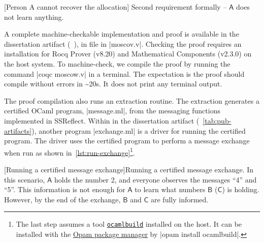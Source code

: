\begin{center}
\begin{minipage}{\textwidth}
\captionsetup{type=lstlisting}
[Person A cannot recover the allocation]{
Second requirement formally -- \(\mathsf{A}\) does not learn anything.}
\label{lst:lemma-2}
\end{minipage}
\end{center}

A complete machine-checkable implementation and proof is available in the dissertation artifact (\cf~), in file in \pr|moscov.v|.
Checking the proof requires an installation for Rocq Prover (v8.20) and Mathematical Components (v2.3.0) on the host system.
To machine-check, we compile the proof by running the command \pr|coqc moscow.v| in a terminal.
The expectation is the proof should compile without errors in \textasciitilde{}20s.
It does not print any terminal output.

The proof compilation also runs an extraction routine.
The extraction generates a certified OCaml program, \pr|message.ml|, from the messaging functions implemented in SSReflect.
Within in the dissertation artifact (\cf~\autoref{tab:pub-artifacts}), another program \pr|exchange.ml| is a {driver} for running the certified program.
The driver uses the certified program to perform a message exchange when run as shown in~\autoref{lst:run-exchange}\footnote{%
The last step assumes a tool \href{https://github.com/ocaml/ocamlbuild}{\texttt{ocamlbuild}} installed on the host.
It can be installed with the \href{https://opam.ocaml.org}{Opam package manager} by \pr|opam install ocamlbuild|.}.

\begin{center}
\captionsetup{type=lstlisting}
\begin{minipage}{\textwidth}
\end{minipage}
[Running a certified message exchange]{Running a certified message exchange.
In this scenario, \(\mathsf{A}\) holds the number 2, and everyone observes the messages \enquote{4} and \enquote{5}.
This information is not enough for \(\mathsf{A}\) to learn what numbers \(\mathsf{B}\) (\resp \(\mathsf{C}\)) is holding.
However, by the end of the exchange, \(\mathsf{B}\) and \(\mathsf{C}\) are fully informed.}
\label{lst:run-exchange}
\end{center}

